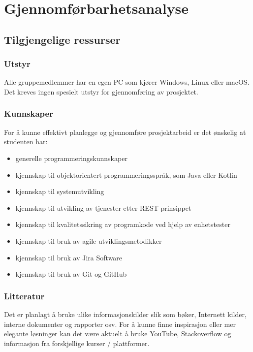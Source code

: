 \section{Gjennomførbarhetsanalyse}

\subsection{Tilgjengelige ressurser}

\subsubsection{Utstyr}
Alle gruppemedlemmer har en egen PC som kjører Windows, Linux eller macOS. Det kreves ingen spesielt utstyr for gjennomføring av prosjektet. 

\subsubsection{Kunnskaper}
For å kunne effektivt planlegge og gjennomføre prosjektarbeid er det ønskelig at studenten har: 

\begin{itemize}
    \item generelle programmeringskunnskaper 
    \item kjennskap til objektorientert programmeringsspråk, som Java eller Kotlin
    \item kjennskap til systemutvikling
    \item kjennskap til utvikling av tjenester etter REST prinsippet
    \item kjennskap til kvalitetssikring av programkode ved hjelp av enhetstester
    \item kjennskap til bruk av agile utviklingsmetodikker
    \item kjennskap til bruk av Jira Software
    \item kjennskap til bruk av Git og GitHub
\end{itemize} 

\subsubsection{Litteratur}
Det er planlagt å bruke ulike informasjonskilder slik som bøker, Internett kilder, interne dokumenter og rapporter osv. For å kunne finne inspirasjon eller mer elegante løsninger kan det være aktuelt å bruke YouTube, Stackoverflow og informasjon fra forskjellige kurser / plattformer.

